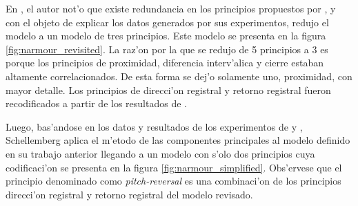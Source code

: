 \begin{imagen}
    \width{10cm}
\end{imagen}


En \cite{Schellenberg96}, el autor not'o que existe redundancia en los principios propuestos por \cite{Narmour91}, y con el objeto de explicar los datos
generados por sus experimentos, redujo el modelo a un modelo de tres principios. Este modelo se presenta en la figura \ref{fig:narmour_revisited}.
La raz'on por la que se redujo de 5 principios a 3 es porque los principios de proximidad, diferencia interv'alica y cierre estaban altamente 
correlacionados. De esta forma se dej'o solamente uno, proximidad, con mayor detalle. Los principios de direcci'on registral y retorno registral
fueron recodificados a partir de los resultados de \cite{CuddyLunney95}.

\begin{imagen}
    \width{9cm}
\end{imagen}



Luego, bas'andose en los datos y resultados de los experimentos de \cite{Schellenberg96} y \citet{CuddyLunney95}, Schellemberg aplica el m'etodo de 
las componentes principales al modelo definido en su trabajo anterior llegando a un modelo con s'olo dos principios cuya codificaci'on
se presenta en la figura \ref{fig:narmour_simplified}. 
Obs'ervese que el principio denominado como \emph{pitch-reversal} es una combinaci'on de los principios direcci'on registral y retorno registral del modelo revisado. 

\begin{imagen}
    \width{10cm}
\end{imagen}

